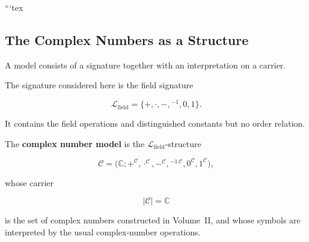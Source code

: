 ```tex
%
%
%

\subsection{The Complex Numbers as a Structure}
\label{subsec:complex-numbers-as-a-structure}



\begin{remark*}[Exposition]

A model consists of a signature together with an interpretation on a carrier.

The signature considered here is the field signature

\[
\mathcal L_{\mathrm{field}}
=
\{+,\cdot,-,{}^{-1},0,1\}.
\]

It contains the field operations and distinguished constants but no order
relation.

\end{remark*}


\begin{definition}
\label{def:complex-number-model}

The \textbf{complex number model} is the
$\mathcal L_{\mathrm{field}}$-structure

\[
\mathcal C
=
\bigl(
\mathbb C;
+^{\mathcal C},
\cdot^{\mathcal C},
-^{\mathcal C},
{}^{-1\,\mathcal C},
0^{\mathcal C},
1^{\mathcal C}
\bigr),
\]

whose carrier

\[
|\mathcal C|
=
\mathbb C
\]

is the set of complex numbers constructed in Volume~II, and whose symbols
are interpreted by the usual complex-number operations.

\end{definition}

